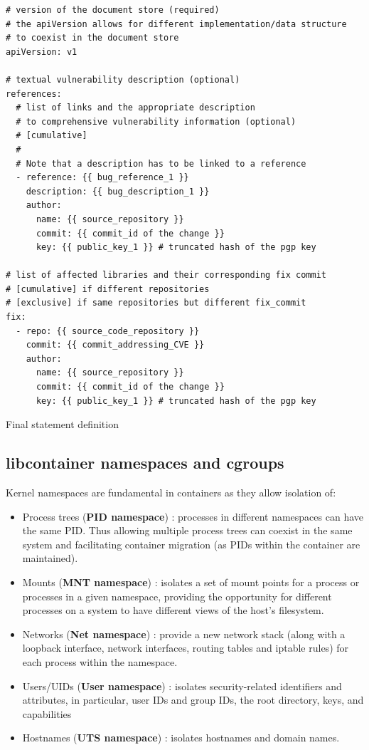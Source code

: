 \documentclass[11pt]{article}
\begin{document}
\begin{listing}[H]
\begin{verbatim}
# version of the document store (required)
# the apiVersion allows for different implementation/data structure
# to coexist in the document store
apiVersion: v1

# textual vulnerability description (optional)
references:
  # list of links and the appropriate description 
  # to comprehensive vulnerability information (optional)
  # [cumulative]
  # 
  # Note that a description has to be linked to a reference 
  - reference: {{ bug_reference_1 }}
    description: {{ bug_description_1 }}
    author:
      name: {{ source_repository }}
      commit: {{ commit_id of the change }}
      key: {{ public_key_1 }} # truncated hash of the pgp key    

# list of affected libraries and their corresponding fix commit
# [cumulative] if different repositories
# [exclusive] if same repositories but different fix_commit
fix:
  - repo: {{ source_code_repository }}
    commit: {{ commit_addressing_CVE }}
    author:
      name: {{ source_repository }}
      commit: {{ commit_id of the change }}
      key: {{ public_key_1 }} # truncated hash of the pgp key    
\end{verbatim}
\caption{Final statement definition}
\label{list:final}
\end{listing}


\subsection{libcontainer namespaces and cgroups}
\label{appendix:libcontainer}

Kernel namespaces are fundamental in containers as they allow isolation of:
\begin{itemize}
    \item Process trees (\textbf{PID namespace}) : processes in different namespaces can have the same PID. Thus allowing multiple process trees can coexist in the same system and facilitating container migration (as PIDs within the container are maintained).
    \item Mounts (\textbf{MNT namespace}) : isolates a set of mount points for a process or processes in a given namespace, providing the opportunity for different processes on a system to have different views of the host's filesystem.
    \item Networks (\textbf{Net namespace}) : provide a new network stack (along with a loopback interface, network interfaces, routing tables and iptable rules) for each process within the namespace. 
    \item Users/UIDs (\textbf{User namespace}) : isolates security-related identifiers and attributes, in particular, user IDs and group IDs, the root directory, keys, and capabilities
    \item Hostnames (\textbf{UTS namespace}) : isolates hostnames and domain names.
\end{itemize}
\end{document}
